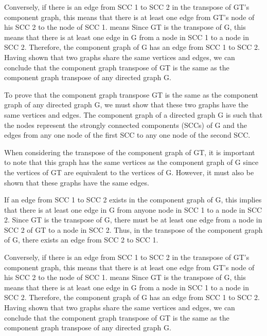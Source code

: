 \documentclass{article}
\begin{document}
Conversely, if there is an edge from SCC 1 to SCC 2 in the transpose of GT's component graph, this means that there is at least one edge from GT's node of his SCC 2 to the node of SCC 1. means Since GT is the transpose of G, this means that there is at least one edge in G from a node in SCC 1 to a node in SCC 2. Therefore, the component graph of G has an edge from SCC 1 to SCC 2. Having shown that two graphs share the same vertices and edges, we can conclude that the component graph transpose of GT is the same as the component graph transpose of any directed graph G.\newline


To prove that the component graph transpose GT is the same as the component graph of any directed graph G, we must show that these two graphs have the same vertices and edges.
The component graph of a directed graph G is such that the nodes represent the strongly connected components (SCCs) of G and the edges from any one node of the first SCC to any one node of the second SCC.\newline


When considering the transpose of the component graph of GT, it is important to note that this graph has the same vertices as the component graph of G since the vertices of GT are equivalent to the vertices of G. However, it must also be shown that these graphs have the same edges.\newline


If an edge from SCC 1 to SCC 2 exists in the component graph of G, this implies that there is at least one edge in G from anyone node in SCC 1 to a node in SCC 2. Since GT is the transpose of G, there must be at least one edge from a node in SCC 2 of GT to a node in SCC 2. Thus, in the transpose of the component graph of G, there exists an edge from SCC 2 to SCC 1.\newline


Conversely, if there is an edge from SCC 1 to SCC 2 in the transpose of GT's component graph, this means that there is at least one edge from GT's node of his SCC 2 to the node of SCC 1. means Since GT is the transpose of G, this means that there is at least one edge in G from a node in SCC 1 to a node in SCC 2. Therefore, the component graph of G has an edge from SCC 1 to SCC 2. Having shown that two graphs share the same vertices and edges, we can conclude that the component graph transpose of GT is the same as the component graph transpose of any directed graph G.\newline
\end{document}
